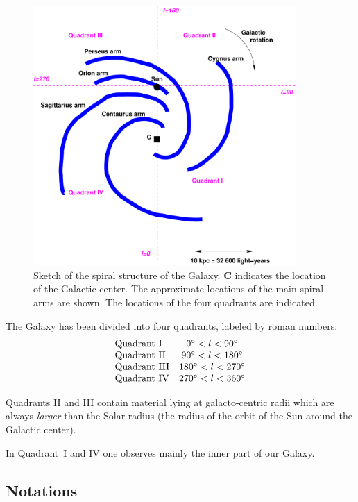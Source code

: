 \begin{figure}[ht]
\begin{center}
\includegraphics[width=10cm]{../figures/mwsketch.pdf}
\end{center}
\caption{Sketch of the spiral structure of the Galaxy. 
{\bf C} indicates the location of the Galactic center. 
The
approximate locations of the main spiral arms are shown. The
locations of the four quadrants are indicated.}
\label{figmwsketch}
\end{figure}  


The Galaxy has been divided into four quadrants, labeled by 
roman numbers: 
\bigskip
\begin{displaymath}
\begin{array}{lc}
\hbox{Quadrant {\sc I}} 	&0\deg < l < 90\deg	\\
\hbox{Quadrant ${\rm II}$} 	&90\deg < l < 180\deg	\\
\hbox{Quadrant ${\rm III}$} 	&180\deg < l < 270\deg	\\
\hbox{Quadrant ${\rm IV}$} 	&270\deg < l < 360\deg 
\end{array}
\end{displaymath}
\bigskip

Quadrants II and III contain material lying  
at galacto-centric radii which are always {\it larger} than the Solar
radius (the radius of the orbit of the Sun around the Galactic center).

In Quadrant~I and IV one observes mainly the inner part of
our Galaxy. 


\subsection{Notations}

